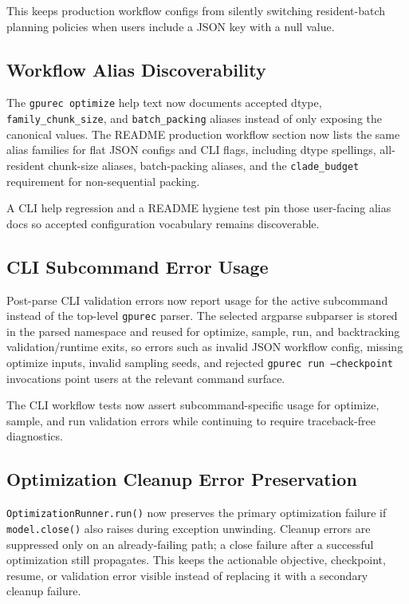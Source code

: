 \documentclass[11pt]{article}
\begin{document}
This keeps production workflow configs from silently switching resident-batch
planning policies when users include a JSON key with a null value.

\subsection{Workflow Alias Discoverability}

The \texttt{gpurec optimize} help text now documents accepted dtype,
\texttt{family\_chunk\_size}, and \texttt{batch\_packing} aliases instead of
only exposing the canonical values.  The README production workflow section
now lists the same alias families for flat JSON configs and CLI flags,
including dtype spellings, all-resident chunk-size aliases, batch-packing
aliases, and the \texttt{clade\_budget} requirement for non-sequential
packing.

A CLI help regression and a README hygiene test pin those user-facing alias
docs so accepted configuration vocabulary remains discoverable.

\subsection{CLI Subcommand Error Usage}

Post-parse CLI validation errors now report usage for the active subcommand
instead of the top-level \texttt{gpurec} parser.  The selected argparse
subparser is stored in the parsed namespace and reused for optimize, sample,
run, and backtracking validation/runtime exits, so errors such as invalid JSON
workflow config, missing optimize inputs, invalid sampling seeds, and rejected
\texttt{gpurec run --checkpoint} invocations point users at the relevant
command surface.

The CLI workflow tests now assert subcommand-specific usage for optimize,
sample, and run validation errors while continuing to require traceback-free
diagnostics.

\subsection{Optimization Cleanup Error Preservation}

\texttt{OptimizationRunner.run()} now preserves the primary optimization
failure if \texttt{model.close()} also raises during exception unwinding.
Cleanup errors are suppressed only on an already-failing path; a close failure
after a successful optimization still propagates.  This keeps the actionable
objective, checkpoint, resume, or validation error visible instead of replacing
it with a secondary cleanup failure.
\end{document}
